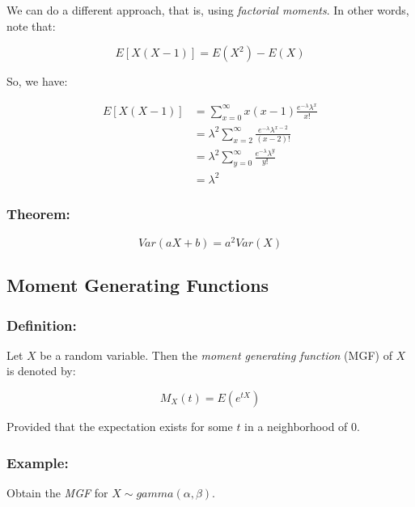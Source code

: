 \documentclass{article}
\begin{document}
\begin{enumerate}
    We can do a different approach, that is, using \textit{factorial moments}. In other words, note that:
    
    \begin{equation*}
        E[X(X-1)] = E(X^2) - E(X)
    \end{equation*}
    
    So, we have:
    
    \begin{equation*}
    \begin{split}
        E[X(X-1)] &= \sum_{x=0}^\infty x(x-1) \frac{e^{-\lambda} \lambda^x}{x!}\\
        &= \lambda^2 \sum_{x=2}^\infty \frac{e^{-\lambda} \lambda^{x-2}}{(x-2)!}\\
        &= \lambda^2 \sum_{y=0}^\infty \frac{e^{-\lambda} \lambda^{y}}{y!}\\
        &= \lambda^2
    \end{split}
    \end{equation*}
\end{enumerate}

\subsubsection*{Theorem:}
\begin{equation*}
    Var(aX+b) = a^2 Var(X)
\end{equation*}

\subsection{Moment Generating Functions}

\subsubsection*{Definition:}
Let $X$ be a random variable. Then the \textit{moment generating function} (MGF) of $X$ is denoted by:

\begin{equation*}
    M_X(t) = E(e^{tX})
\end{equation*}

Provided that the expectation exists for some $t$ in a neighborhood of 0. 

\subsubsection*{Example:}

Obtain the \textit{MGF} for $X\sim gamma(\alpha,\beta)$.
\end{document}
